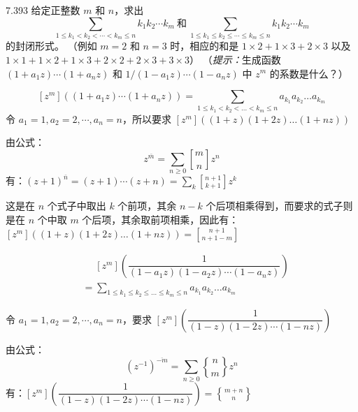 \begin{problem}{7.39}{3}
  给定正整数 \( m \) 和 \( n \)，求出
  \[
    \sum_{1 \leqslant k_1 < k_2 < \cdots < k_m \leqslant n} k_1 k_2 \cdots k_m \ \text{和} \ \sum_{1 \leqslant k_1 \leqslant k_2 \leqslant \cdots \leqslant k_m \leqslant n} k_1 k_2 \cdots k_m
  \]
  的封闭形式。
  （例如 \( m=2 \) 和 \( n=3 \) 时，相应的和是 \( 1 \times 2 + 1 \times 3 + 2 \times 3 \) 以及 \( 1 \times 1 + 1 \times 2 + 1 \times 3 + 2 \times 2 + 2 \times 3 + 3 \times 3 \)）
  （\textit{提示：}生成函数 \( (1+a_1z) \cdots (1+a_nz) \) 和 \( 1 / (1-a_1z) \cdots (1-a_nz) \) 中 \( z^m \) 的系数是什么？）
\end{problem}

\[
  [z^m] ((1 + a_1 z) \cdots (1 + a_n z)) = \sum_{1 \leqslant k_1 < k_2 < \dots < k_m \leqslant n} a_{k_1} a_{k_2} \dots a_{k_m}
\]
令 \( a_1 = 1 , a_2 = 2 , \cdots , a_n = n \)，所以要求 \( [z^m] ( (1+z)(1+2z) \dots (1+nz) ) \)

由公式：
\[
  \boxed{z^{\overline{m}} = \sum_{n \geqslant 0} \genfrac{[}{]}{0pt}{} {m}{n} z^n}
\]
有：\( (z+1)^{\overline{n}} = (z+1) \cdots (z+n) = \sum_k \genfrac{[}{]}{0pt}{} {n+1}{k+1} z^{k} \)

这是在 \( n \) 个式子中取出 \( k \) 个前项，其余 \( n-k \) 个后项相乘得到，而要求的式子则是在 \( n \) 个中取 \( m \) 个后项，其余取前项相乘，因此有：\( [z^m] ( (1+z)(1+2z) \dots (1+nz) ) = \genfrac{[}{]}{0pt}{} {n+1}{n+1-m} \)

\begin{align*}
  &\phantom{=} [z^m] (\dfrac{1}{(1-a_1z)(1-a_2z) \cdots (1-a_nz)}) \\
  &= \sum_{1 \leqslant k_1 \leqslant k_2 \leqslant \dots \leqslant k_m \leqslant n} a_{k_1} a_{k_2} \dots a_{k_m}
\end{align*}

令 \( a_1 = 1 , a_2 = 2 , \cdots , a_n = n \)，要求 \( [z^m] (\dfrac{1}{(1-z)(1-2z) \cdots (1-nz)}) \)

由公式：
\[
  \boxed{(z^{-1})^{\overline{-m}} = \sum_{n \geqslant 0} \genfrac{\{}{\}}{0pt}{} {n}{m} z^n}
\]
有：\( [z^m] (\dfrac{1}{(1-z)(1-2z) \cdots (1-nz)}) = \genfrac{\{}{\}}{0pt}{} {m+n}{n} \)
